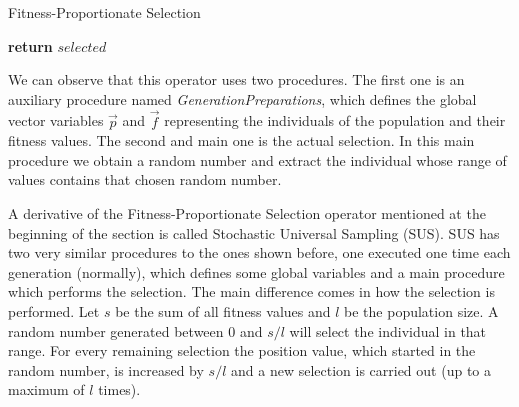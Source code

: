 \begin{algorithm}[H]
    \caption{Fitness-Proportionate Selection}
    \begin{algorithmic}[1]
             
             
            \EndIf
             
            \EndFor
        \EndProcedure
                \EndIf
            \EndFor
            \State \textbf{return} $selected$
        \EndProcedure
    \end{algorithmic}
\end{algorithm}

We can observe that this operator uses two procedures. The first one is an auxiliary procedure named \textit{GenerationPreparations}, which defines the global vector variables $\vec{p}$ and $\vec{f}$ representing the individuals of the population and their fitness values. The second and main one is the actual selection. In this main procedure we obtain a random number and extract the individual whose range of values contains that chosen random number.

A derivative of the Fitness-Proportionate Selection operator mentioned at the beginning of the section is called Stochastic Universal Sampling (SUS). SUS has two very similar procedures to the ones shown before, one executed one time each generation (normally), which defines some global variables and a main procedure which performs the selection. The main difference comes in how the selection is performed. Let $s$ be the sum of all fitness values and $l$ be the population size. A random number generated between $0$ and $s / l$ will select the individual in that range. For every remaining selection the position value, which started in the random number, is increased by $s / l$ and a new selection is carried out (up to a maximum of $l$ times).


